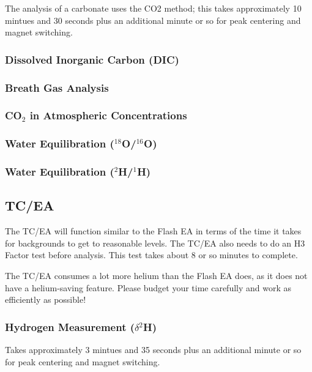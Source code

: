 \documentclass[12pt]{../SOP4_alpha}\usepackage[]{graphicx}\usepackage[]{color}
\begin{document}
\NP The analysis of a carbonate uses the CO2 method; this takes approximately 10 mintues and 30 seconds plus an additional minute or so for peak centering and magnet switching.

\subsubsection{Dissolved Inorganic Carbon (DIC)}

\subsubsection{Breath Gas Analysis}

\subsubsection{CO$_2$ in Atmospheric Concentrations}

\subsubsection{Water Equilibration ($^{18}$O/$^{16}$O)}

\subsubsection{Water Equilibration ($^2$H/$^1$H)}

\subsection{TC/EA}

\NP The TC/EA will function similar to the Flash EA in terms of the time it takes for backgrounds to get to reasonable levels. The TC/EA also needs to do an H3 Factor test before analysis. This test takes about 8 or so minutes to complete.

\NP The TC/EA consumes a lot more helium than the Flash EA does, as it does not have a helium-saving feature. Please budget your time carefully and work as efficiently as possible!

\subsubsection{Hydrogen Measurement ($\delta$$^{2}$H)}

\NP Takes approximately 3 mintues and 35 seconds plus an additional minute or so for peak centering and magnet switching.
\end{document}
